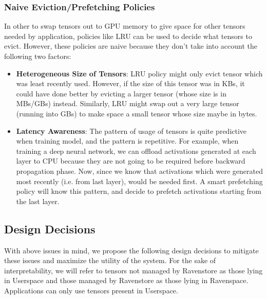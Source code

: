 \documentclass{article}
\begin{document}
	\subsubsection{Naive Eviction/Prefetching Policies} In other to swap tensors out to GPU memory to give space for other tensors needed by application,
	policies like LRU can be used to decide what tensors to evict. However, these policies are naive because they don't take into account the following two factors:
	\begin{itemize}
		\item \textbf{Heterogeneous Size of Tensors}: LRU policy might only evict tensor which was least recently used. However, 
		if the size of this tensor was in KBs, it could have done better by evicting a larger tensor (whose size is in MBs/GBs) instead. Similarly,
		LRU might swap out a very large tensor (running into GBs) to make space a small tensor whose size maybe in bytes.
		\item \textbf{Latency Awareness}: The pattern of usage of tensors is quite predictive when training model, and the pattern is repetitive. For example,
		when training a deep neural network, we can offload activations generated at each layer to CPU because they are not going to be required before backward propagation phase.
		Now, since we know that activations which were generated most recently (i.e. from last layer), would be needed first.
		A smart prefetching policy will know this pattern, and decide to prefetch activations starting from the last layer.
	\end{itemize}

\subsection{Design Decisions}
With above issues in mind, we propose the following design decisions to mitigate these issues and maximize
the utility of the system. For the sake of interpretability, we will refer to tensors not managed by Ravenstore as those lying in
Userspace and those managed by Ravenstore as those lying in Ravenspace. Applications can only use tensors present in Userspace.
\end{document}
